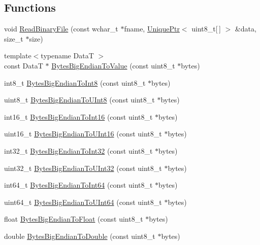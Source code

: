 \subsection*{Functions}
\begin{DoxyCompactItemize}
\item 
void \hyperlink{namespacemage_aef2e639196d406b6cfe71815d46b5cf9}{Read\+Binary\+File} (const wchar\+\_\+t $\ast$fname, \hyperlink{namespacemage_a8c307fbcc33bce9b7f2aa4c26c3b95cf}{Unique\+Ptr}$<$ uint8\+\_\+t\mbox{[}$\,$\mbox{]} $>$ \&data, size\+\_\+t $\ast$size)
\item 
{\footnotesize template$<$typename DataT $>$ }\\const DataT $\ast$ \hyperlink{namespacemage_a71ef38ad4287cdd1fdfa843029aef5b7}{Bytes\+Big\+Endian\+To\+Value} (const uint8\+\_\+t $\ast$bytes)
\item 
int8\+\_\+t \hyperlink{namespacemage_a7dd5ebfc406cb1d6a8a403a8db29af36}{Bytes\+Big\+Endian\+To\+Int8} (const uint8\+\_\+t $\ast$bytes)
\item 
uint8\+\_\+t \hyperlink{namespacemage_a89be63c40055cf211d63423bb25be1cc}{Bytes\+Big\+Endian\+To\+U\+Int8} (const uint8\+\_\+t $\ast$bytes)
\item 
int16\+\_\+t \hyperlink{namespacemage_a67572c654c8ede11eed23c9c556e439f}{Bytes\+Big\+Endian\+To\+Int16} (const uint8\+\_\+t $\ast$bytes)
\item 
uint16\+\_\+t \hyperlink{namespacemage_a90b2972b7a2a01d4a911d071303bc400}{Bytes\+Big\+Endian\+To\+U\+Int16} (const uint8\+\_\+t $\ast$bytes)
\item 
int32\+\_\+t \hyperlink{namespacemage_ae98f64655a7d791c6c6efba16ce6b8e8}{Bytes\+Big\+Endian\+To\+Int32} (const uint8\+\_\+t $\ast$bytes)
\item 
uint32\+\_\+t \hyperlink{namespacemage_aab7d431dcaf0965028de7c5dee9c3da4}{Bytes\+Big\+Endian\+To\+U\+Int32} (const uint8\+\_\+t $\ast$bytes)
\item 
int64\+\_\+t \hyperlink{namespacemage_a52f6dec57a9c644e912a88f8cfabe199}{Bytes\+Big\+Endian\+To\+Int64} (const uint8\+\_\+t $\ast$bytes)
\item 
uint64\+\_\+t \hyperlink{namespacemage_a7509f9c1a6cf98056f2deaa8a2f45c7c}{Bytes\+Big\+Endian\+To\+U\+Int64} (const uint8\+\_\+t $\ast$bytes)
\item 
float \hyperlink{namespacemage_ae184a2848f1a490c58f617a9d93b3c88}{Bytes\+Big\+Endian\+To\+Float} (const uint8\+\_\+t $\ast$bytes)
\item 
double \hyperlink{namespacemage_a348085d95b0f0d2276cf9fad8a8d8b1d}{Bytes\+Big\+Endian\+To\+Double} (const uint8\+\_\+t $\ast$bytes)

\end{DoxyCompactItemize}
